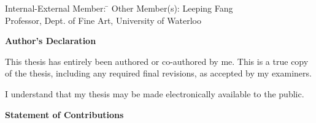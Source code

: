   \noindent
\begin{tabbing}
Internal-External Member: \=  \kill %
Other Member(s): \> Leeping Fang \\
\> Professor, Dept. of Fine Art, University of Waterloo \\
\end{tabbing}

\cleardoublepage

 \begin{center}\textbf{Author's Declaration}\end{center}
  
 \noindent
This thesis has entirely been authored or co-authored by me. This is a true copy of the thesis, including any required final revisions, as accepted by my examiners.

  \bigskip
  
  \noindent
I understand that my thesis may be made electronically available to the public.

\cleardoublepage

  \begin{center}\textbf{Statement of Contributions}\end{center}
  
